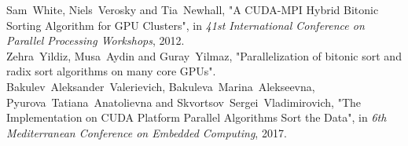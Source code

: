 \documentclass[journal]{IEEEtran}
\begin{document}
\begin{thebibliography}{1}

Sam~White, Niels~Verosky and Tia~Newhall, "A CUDA-MPI Hybrid Bitonic Sorting Algorithm for GPU Clusters", in \emph{41st International Conference on Parallel Processing Workshops}, 2012.
\\
Zehra~Yildiz, Musa~Aydin and Guray~Yilmaz, "Parallelization of bitonic sort and radix sort algorithms on many core GPUs".
\\
Bakulev~Aleksander~Valerievich, Bakuleva~Marina~Alekseevna, Pyurova~Tatiana~Anatolievna and Skvortsov~Sergei~Vladimirovich, "The Implementation on CUDA Platform Parallel
Algorithms Sort the Data", in \emph{6th Mediterranean Conference on Embedded Computing}, 2017.

\end{thebibliography}
\end{document}
